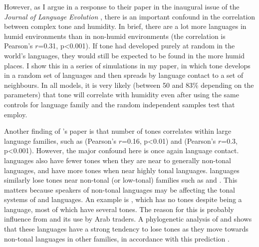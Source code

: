 \documentclass[output=paper]{langsci/langscibook}
\begin{document}
However, as I argue in a
response to their paper in the inaugural issue of the \textit{Journal of Language Evolution} \citeyear{CollinsInPress}, there is
an important confound in the correlation between complex tone and humidity.  In brief, there are a lot more languages in humid environments than in non-humid environments (the correlation is Pearson’s $r$=0.31, p{\textless}0.001).  If tone had developed purely at random in the world’s languages, they would still be expected to be found in the more humid places.  I show this in a series of simulations in my paper, in which tone develops in a random set of languages and then spreads by language contact to a set of neighbours.  In all models, it is very likely (between 50 and 83\% depending on the parameters) that tone will correlate with humidity even after using the same controls for language family and the random independent samples test that \citeauthor{Everett2015} employ. 



  
 




Another finding of \citeauthor{Everett2015}’s paper is that number of tones correlates within large language families, such as  (Pearson’s $r$=0.16, p{\textless}0.01) and  (Pearson’s $r$=0.3, p{\textless}0.001).  However, the major confound here is once again language contact.   languages also have fewer tones when they are near to generally non-tonal  languages, and have more tones when near highly tonal  languages.   languages similarly lose tones near non-tonal (or low-tonal) families such as  and .  This matters because speakers of non-tonal languages may be affecting the tonal systems of  and  languages.  An example is , which has no tones despite being a  language, most of which have several tones.  The reason for this is probably influence from  and its use by Arab traders.  A phylogenetic analysis of  and  shows that these languages have a strong tendency to lose tones as they move towards non-tonal languages in other families, in accordance with this prediction \citep{CollinsInPress}.  
\end{document}
